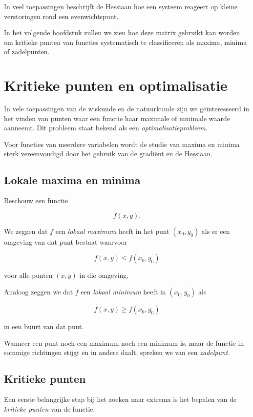 \documentclass[11pt,a4paper]{article}
\begin{document}
    In veel toepassingen beschrijft de Hessiaan hoe een systeem reageert
    op kleine verstoringen rond een evenwichtspunt.

    In het volgende hoofdstuk zullen we zien hoe deze matrix gebruikt
    kan worden om kritieke punten van functies systematisch te
    classificeren als maxima, minima of zadelpunten.


    \section{Kritieke punten en optimalisatie}

    In vele toepassingen van de wiskunde en de natuurkunde zijn we geïnteresseerd
    in het vinden van punten waar een functie haar maximale of minimale waarde
    aanneemt. Dit probleem staat bekend als een \textit{optimalisatieprobleem}.

    Voor functies van meerdere variabelen wordt de studie van maxima en minima
    sterk vereenvoudigd door het gebruik van de gradiënt en de Hessiaan.

    \subsection{Lokale maxima en minima}

    Beschouw een functie

    \[
        f(x,y).
    \]

    We zeggen dat $f$ een \textit{lokaal maximum} heeft in het punt $(x_0,y_0)$
    als er een omgeving van dat punt bestaat waarvoor

    \[
        f(x,y) \le f(x_0,y_0)
    \]

    voor alle punten $(x,y)$ in die omgeving.

    Analoog zeggen we dat $f$ een \textit{lokaal minimum} heeft in $(x_0,y_0)$
    als

    \[
        f(x,y) \ge f(x_0,y_0)
    \]

    in een buurt van dat punt.

    Wanneer een punt noch een maximum noch een minimum is,
    maar de functie in sommige richtingen stijgt en in andere daalt,
    spreken we van een \textit{zadelpunt}.

    \subsection{Kritieke punten}

    Een eerste belangrijke stap bij het zoeken naar extrema
    is het bepalen van de \textit{kritieke punten} van de functie.
\end{document}
